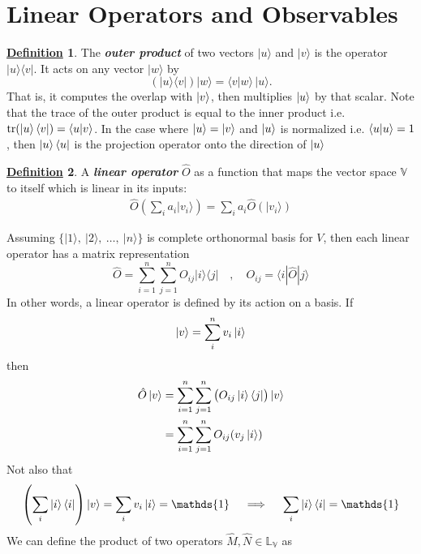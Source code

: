 \documentclass[11pt, answers]{exam}
\theoremstyle{definition}
\newtheorem{definition}{\underline{Definition}}[section]
\theoremstyle{bulleted}
\begin{document}
	\section{Linear Operators and Observables}
	\begin{definition}
		The \textbf{\textit{outer product}} of two vectors \(\lvert u\rangle\) and \(\lvert v\rangle\) is the operator $\lvert u\rangle\langle v\rvert$. 
		It acts on any vector \(\lvert w\rangle\) by
		\[
		(\lvert u\rangle\langle v\rvert)\lvert w\rangle
		=\langle v\vert w\rangle\,\lvert u\rangle.
		\]
		That is, it computes the overlap with \(\ket{v}\), then multiplies \(\ket{u}\) by that scalar. Note that the trace of the outer product is equal to the inner product i.e. $\operatorname{tr}(\ket{u}\bra{v}) = \braket{u|v}$. In the case where $\ket{u}=\ket{v}$ and $\ket{u}$ is normalized i.e. $\braket{u|u}=1$, then $\ket{u}\bra{u}$ is the projection operator onto the direction of $\ket{u}$
	\end{definition}
	\begin{definition}
		A \textbf{\textit{linear operator}} \(\hat O\) as a function that maps the vector space \(\mathbb V\) to itself which is linear in its inputs:
			\begin{align*}
					\hat O\left(\sum_i a_i|v_i\rangle\right)=
				\sum_i a_i\hat O(|v_i\rangle)
			\end{align*}
	\end{definition}
	\noindent Assuming $\bigl\{|1\rangle,\ |2\rangle,\ \ldots,\ |n\rangle\bigr\}$ is complete orthonormal basis for \(V\), then each linear operator has a matrix representation
	\[
	\hat O=\sum_{i=1}^{n}\sum_{j=1}^{n}O_{ij}|i\rangle\langle j|\quad,
	\quad
	O_{ij}=\langle i|\hat O|j\rangle
	\]
	\noindent In other words, a linear operator is defined by its action on a basis. If \begin{align*}
		\ket{v} = \sum_{i}^{n} v_i\ket{i}
	\end{align*}
	then
	\begin{align*}
		\hat{O}\ket{v} &= \sum_{i=1}^n\sum_{j=1}^n \left(O_{ij}\ket{i}\bra{j}\right)\ket{v} \\
		&= \sum_{i=1}^n\sum_{j=1}^n O_{ij}(v_j\ket{i})
	\end{align*}
	Not also that
	\begin{align*}
		\left(\sum_{i}\ket{i}\bra{i}\right)\ket{v} = \sum_{i}v_i\ket{i}=\mathds{1} \quad\implies\quad \sum_{i} \ket{i}\bra{i} = \mathds{1}
	\end{align*}
	We can define the product of two operators \(\hat M,\hat N\in \mathbb{L}_\mathbb{V}\) as
\end{document}
